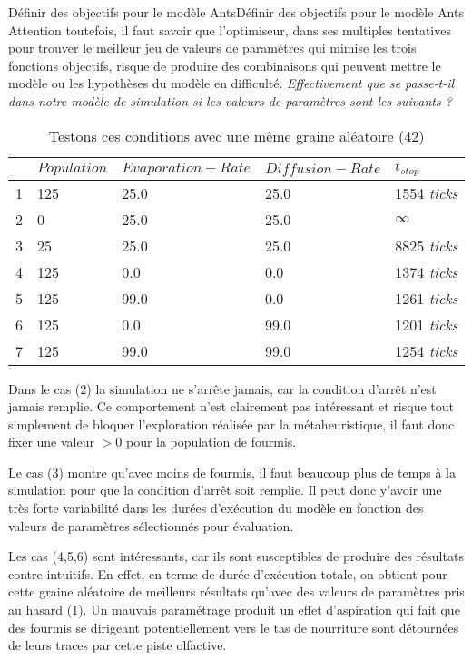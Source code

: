 \begin{testiv}{Définir des objectifs pour le modèle Ants}{Définir des objectifs pour le modèle Ants}
Attention toutefois, il faut savoir que l'optimiseur, dans ses multiples tentatives pour trouver le meilleur jeu de valeurs de paramètres qui mimise les trois fonctions objectifs, risque de produire des combinaisons qui peuvent mettre le modèle ou les hypothèses du modèle en difficulté. \textit{Effectivement que se passe-t-il dans notre modèle de simulation si les valeurs de paramètres sont les suivants ? }

\begin{table}[H]
\centering
\caption{Testons ces conditions avec une même graine aléatoire (42)}
\label{tab:experience}
\begin{tabular}{lllll}
\hline
  & $Population$ & $Evaporation-Rate$ & $Diffusion-Rate$ & $t_{stop}$ \\ \hline
1 & 125        & 25.0             & 25.0  & 1554 \textit{ticks} \\
2 & 0          & 25.0             & 25.0  & $\infty$ \\
3 & 25         & 25.0             & 25.0  & 8825 \textit{ticks} \\
4 & 125        & 0.0              & 0.0   & 1374 \textit{ticks} \\
5 & 125        & 99.0             & 0.0   & 1261 \textit{ticks} \\
6 & 125        & 0.0              & 99.0  & 1201 \textit{ticks} \\
7 & 125        & 99.0             & 99.0  & 1254 \textit{ticks} \\ \hline
\end{tabular}
\end{table}

Dans le cas (2) la simulation ne s'arrête jamais, car la condition d'arrêt n'est jamais remplie. Ce comportement n'est clairement pas intéressant et risque tout simplement de bloquer l'exploration réalisée par la métaheuristique, il faut donc fixer une valeur $> 0$ pour la population de fourmis.

Le cas (3) montre qu'avec moins de fourmis, il faut beaucoup plus de temps à la simulation pour que la condition d'arrêt soit remplie. Il peut donc y'avoir une très forte variabilité dans les durées d'exécution du modèle en fonction des valeurs de paramètres sélectionnés pour évaluation.

Les cas (4,5,6) sont intéressants, car ils sont susceptibles de produire des résultats contre-intuitifs. En effet, en terme de durée d'exécution totale, on obtient pour cette graine aléatoire de meilleurs résultats qu'avec des valeurs de paramètres pris au hasard (1). Un mauvais paramétrage produit un effet d'aspiration qui fait que des fourmis se dirigeant potentiellement vers le tas de nourriture sont détournées de leurs traces par cette piste olfactive.


\end{testiv}
